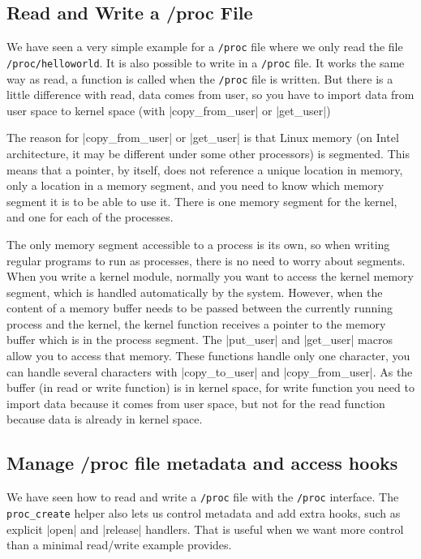\documentclass[10pt, oneside]{book}
\begin{document}
\subsection{Read and Write a /proc File}
\label{sec:read_write_procfs}
We have seen a very simple example for a \verb|/proc| file where we only read the file \verb|/proc/helloworld|.
It is also possible to write in a \verb|/proc| file.
It works the same way as read, a function is called when the \verb|/proc| file is written.
But there is a little difference with read, data comes from user, so you have to import data from user space to kernel space (with \cpp|copy_from_user| or \cpp|get_user|)

The reason for \cpp|copy_from_user| or \cpp|get_user| is that Linux memory (on Intel architecture, it may be different under some other processors) is segmented.
This means that a pointer, by itself, does not reference a unique location in memory, only a location in a memory segment, and you need to know which memory segment it is to be able to use it.
There is one memory segment for the kernel, and one for each of the processes.

The only memory segment accessible to a process is its own, so when writing regular programs to run as processes, there is no need to worry about segments.
When you write a kernel module, normally you want to access the kernel memory segment, which is handled automatically by the system.
However, when the content of a memory buffer needs to be passed between the currently running process and the kernel, the kernel function receives a pointer to the memory buffer which is in the process segment.
The \cpp|put_user| and \cpp|get_user| macros allow you to access that memory.
These functions handle only one character, you can handle several characters with \cpp|copy_to_user| and \cpp|copy_from_user|.
As the buffer (in read or write function) is in kernel space, for write function you need to import data because it comes from user space, but not for the read function because data is already in kernel space.


\subsection{Manage /proc file metadata and access hooks}
\label{sec:manage_procfs}
We have seen how to read and write a \verb|/proc| file with the \verb|/proc| interface.
The \verb|proc_create| helper also lets us control metadata and add extra hooks, such as explicit \cpp|open| and \cpp|release| handlers.
That is useful when we want more control than a minimal read/write example provides.
\end{document}
